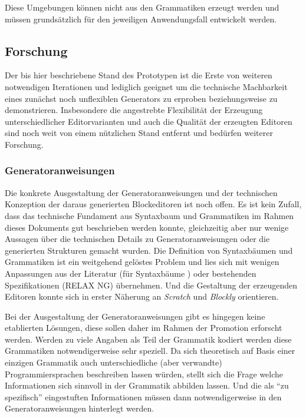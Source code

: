 \documentclass[paper=a4,fontsize=11pt,parskip=half]{scrartcl}
\begin{document}
Diese Umgebungen können nicht aus den Grammatiken erzeugt werden und müssen grundsätzlich für den jeweiligen Anwendungsfall entwickelt werden.

\subsection{Forschung}

Der bis hier beschriebene Stand des Prototypen ist die Erste von weiteren notwendigen Iterationen und lediglich geeignet um die technische Machbarkeit eines zunächst noch unflexiblen Generators zu erproben beziehungsweise zu demonstrieren. Insbesondere die angestrebte Flexibilität der Erzeugung unterschiedlicher Editorvarianten und auch die Qualität der erzeugten Editoren sind noch weit von einem nützlichen Stand entfernt und bedürfen weiterer Forschung.

\subsubsection{Generatoranweisungen}

Die konkrete Ausgestaltung der Generatoranweisungen und der technischen Konzeption der daraus generierten Blockeditoren ist noch offen. Es ist kein Zufall, dass das technische Fundament aus Syntaxbaum und Grammatiken im Rahmen dieses Dokuments gut beschrieben werden konnte, gleichzeitig aber nur wenige Aussagen über die technischen Details zu Generatoranweisungen oder die generierten Strukturen gemacht wurden. Die Definition von Syntaxbäumen und Grammatiken ist ein weitgehend gelöstes Problem und lies sich mit wenigen Anpassungen aus der Literatur (für Syntaxbäume \cite{aho_compilers:_2007}) oder bestehenden Spezifikationen (RELAX NG\cite{clark_relax_2001}) übernehmen. Und die Gestaltung der erzeugenden Editoren konnte sich in erster Näherung an \textit{Scratch} \cite{maloney_scratch:_2004} und \textit{Blockly} \cite{fraser_ten_2015} orientieren.

Bei der Ausgestaltung der Generatoranweisungen gibt es hingegen keine etablierten Lösungen, diese sollen daher im Rahmen der Promotion erforscht werden. Werden zu viele Angaben als Teil der Grammatik kodiert werden diese Grammatiken notwendigerweise sehr speziell. Da sich theoretisch auf Basis einer einzigen Grammatik auch unterschiedliche (aber verwandte) Programmiersprachen beschreiben lassen würden, stellt sich die Frage welche Informationen sich sinnvoll in der Grammatik abbilden lassen. Und die als \enquote{zu spezifisch} eingestuften Informationen müssen dann notwendigerweise in den Generatoranweisungen hinterlegt werden.
\end{document}
